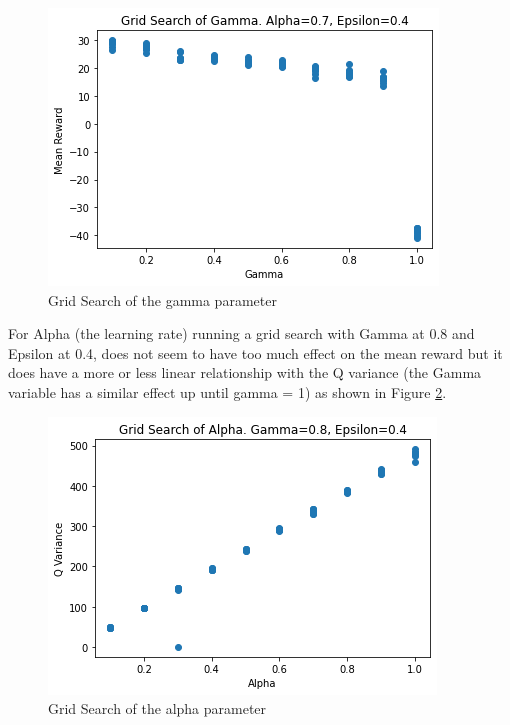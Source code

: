 \documentclass[a4pape, 11pt, english]{article}
\begin{document}
\begin{figure}[h!]
	\begin{center}
		\includegraphics[scale=0.5]{img/GridSearchGamma.png}
		\caption{Grid Search of the gamma parameter}
		\label{fig:GridSearchGamma}
	\end{center}
\end{figure}

For Alpha (the learning rate) running a grid search with Gamma at 0.8 and Epsilon at 0.4, does not seem to have too much effect on the mean reward but it does have a more or less linear relationship with the Q variance (the Gamma variable has a similar effect up until gamma = 1) as shown in Figure \ref{fig:GridSearchAlpha}.

\begin{figure}[h!]
	\begin{center}
		\includegraphics[scale=0.5]{img/GridSearchAlphaQ.png}
		\caption{Grid Search of the alpha parameter}
		\label{fig:GridSearchAlpha}
	\end{center}
\end{figure}
\end{document}
